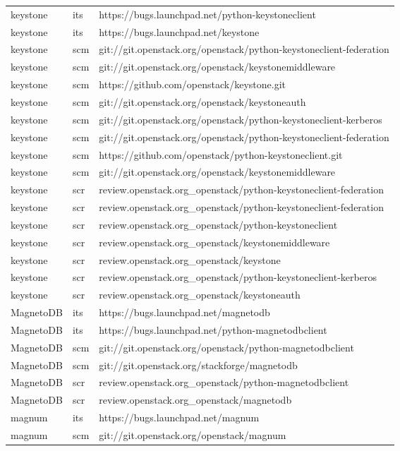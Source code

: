 \begin{center}
\begin{longtable}{|p{4cm}|p{1cm}|p{10cm}|}
keystone&its&https://bugs.launchpad.net/python-keystoneclient\\ 
keystone&its&https://bugs.launchpad.net/keystone\\ 
keystone&scm&git://git.openstack.org/openstack/python-keystoneclient-federation\\ 
keystone&scm&git://git.openstack.org/openstack/keystonemiddleware\\ 
keystone&scm&https://github.com/openstack/keystone.git\\ 
keystone&scm&git://git.openstack.org/openstack/keystoneauth\\ 
keystone&scm&git://git.openstack.org/openstack/python-keystoneclient-kerberos\\ 
keystone&scm&git://git.openstack.org/openstack/python-keystoneclient-federation\\ 
keystone&scm&https://github.com/openstack/python-keystoneclient.git\\ 
keystone&scm&git://git.openstack.org/openstack/keystonemiddleware\\ 
keystone&scr&review.openstack.org\_openstack/python-keystoneclient-federation\\ 
keystone&scr&review.openstack.org\_openstack/python-keystoneclient-federation\\ 
keystone&scr&review.openstack.org\_openstack/python-keystoneclient\\ 
keystone&scr&review.openstack.org\_openstack/keystonemiddleware\\ 
keystone&scr&review.openstack.org\_openstack/keystone\\ 
keystone&scr&review.openstack.org\_openstack/python-keystoneclient-kerberos\\ 
keystone&scr&review.openstack.org\_openstack/keystoneauth\\ 
MagnetoDB&its&https://bugs.launchpad.net/magnetodb\\ 
MagnetoDB&its&https://bugs.launchpad.net/python-magnetodbclient\\ 
MagnetoDB&scm&git://git.openstack.org/openstack/python-magnetodbclient\\ 
MagnetoDB&scm&git://git.openstack.org/stackforge/magnetodb\\ 
MagnetoDB&scr&review.openstack.org\_openstack/python-magnetodbclient\\ 
MagnetoDB&scr&review.openstack.org\_openstack/magnetodb\\ 
magnum&its&https://bugs.launchpad.net/magnum\\ 
magnum&scm&git://git.openstack.org/openstack/magnum\\ 

\end{longtable}
\end{center}
